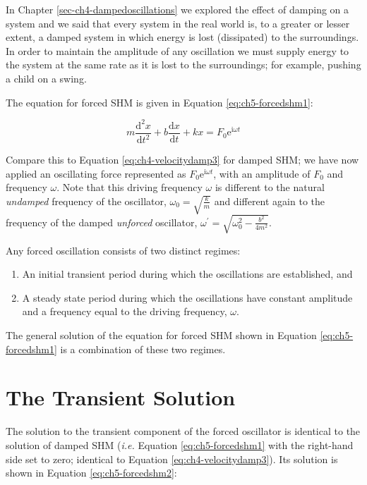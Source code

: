 \documentclass[
]{book}
\providecommand{\tightlist}{%
  \setlength{\itemsep}{0pt}\setlength{\parskip}{0pt}}
\begin{document}
In Chapter \ref{sec-ch4-dampedoscillations} we explored the effect of damping on a system and we said that every system in the real world is, to a greater or lesser extent, a damped system in which energy is lost (dissipated) to the surroundings. In order to maintain the amplitude of any oscillation we must supply energy to the system at the same rate as it is lost to the surroundings; for example, pushing a child on a swing.

The equation for forced SHM is given in Equation \eqref{eq:ch5-forcedshm1}:

\begin{equation}
m \frac{\mathrm{d}^2 x}{\mathrm{d}t^2} + b \frac{\mathrm{d}x}{\mathrm{d}t}+ kx = F_0 \mathrm{e}^{\mathrm{i}\omega t}
\label{eq:ch5-forcedshm1}
\end{equation}

Compare this to Equation \eqref{eq:ch4-velocitydamp3} for damped SHM; we have now applied an oscillating force represented as \(F_0 \mathrm{e}^{\mathrm{i}\omega t}\), with an amplitude of \(F_0\) and frequency \(\omega\). Note that this driving frequency \(\omega\) is different to the natural \emph{undamped} frequency of the oscillator, \(\omega_0 = \sqrt{\frac{k}{m}}\) and different again to the frequency of the damped \emph{unforced} oscillator, \(\omega^\prime = \sqrt{\omega_0^2 - \frac{b^2}{4m^2}}\).

Any forced oscillation consists of two distinct regimes:

\begin{enumerate}
\def\labelenumi{\arabic{enumi}.}
\tightlist
\item
  An initial transient period during which the oscillations are established, and
\item
  A steady state period during which the oscillations have constant amplitude and a frequency equal to the driving frequency, \(\omega\).
\end{enumerate}

The general solution of the equation for forced SHM shown in Equation \eqref{eq:ch5-forcedshm1} is a combination of these two regimes.

\hypertarget{sec-ch5-transientsolution}{%
\section{The Transient Solution}\label{sec-ch5-transientsolution}}

The solution to the transient component of the forced oscillator is identical to the solution of damped SHM (\emph{i.e.} Equation \eqref{eq:ch5-forcedshm1} with the right-hand side set to zero; identical to Equation \eqref{eq:ch4-velocitydamp3}). Its solution is shown in Equation \eqref{eq:ch5-forcedshm2}:
\end{document}
